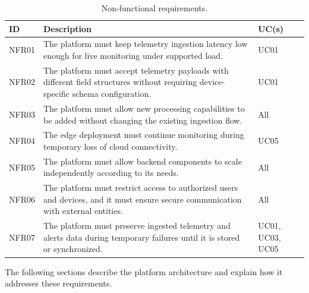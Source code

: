 \begin{table}[H]
    \centering
    \caption{Non-functional requirements.}
    \label{tab:non-functional-requirements}
    \small
    \begin{tabularx}{\textwidth}{l X l}
        \toprule
        \textbf{ID} & \textbf{Description}                                                                                                                & \textbf{UC(s)}   \\
        \midrule
        NFR01       & The platform must keep telemetry ingestion latency low enough for live monitoring under supported load.                             & UC01             \\
        NFR02       & The platform must accept telemetry payloads with different field structures without requiring device-specific schema configuration. & UC01             \\
        NFR03       & The platform must allow new processing capabilities to be added without changing the existing ingestion flow.                       & All              \\
        NFR04       & The edge deployment must continue monitoring during temporary loss of cloud connectivity.                                           & UC05             \\
        NFR05       & The platform must allow backend components to scale independently according to its needs.                                           & All              \\
        NFR06       & The platform must restrict access to authorized users and devices, and it must ensure secure communication with external entities.  & All              \\
        NFR07       & The platform must preserve ingested telemetry and alerts data during temporary failures until it is stored or synchronized.         & UC01, UC03, UC05 \\
        \bottomrule
    \end{tabularx}
\end{table}

The following sections describe the platform architecture and explain how it addresses these requirements.
